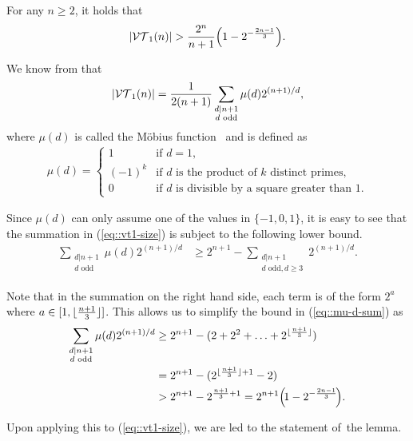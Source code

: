 \begin{lemma} \label{prop::vt1-lower-bound}
    For any $n \geq 2$, it holds that
    \begin{equation*}
        |\vt{1}{n}| > \frac{2^n}{n+1} \parenv*{1-2^{-\frac{2n-1}{3}}}.
    \end{equation*}
\end{lemma}
\begin{IEEEproof}
    We know from \cite[Corollary 2.3]{sloaneSingleDeletionCorrectingCodes2002} that
    \begin{align}
        |\mathcal{VT}_{1}(n)| = \frac{1}{2(n+1)} \sum_{\substack{d|n+1 \\ d \text{ odd}}} \mu(d)2^{(n+1)/d}, \label{eq::vt1-size}
    \end{align}
    where $\mu(d)$ is called the Möbius function~\cite{mobius1832} and is defined as
    \begin{align*}
        \mu(d) = \begin{cases}
            1 \!\! & \!\! \text{if } d=1, \\
            (-1)^k \!\! & \!\! \text{if $d$ is the product of $k$ distinct primes,} \\
            0 \!\! & \!\! \text{if $d$ is divisible by a square greater than $1$.}            
        \end{cases}
    \end{align*}

    Since $\mu(d)$ can only assume one of the values in $\{-1,0,1\}$, it is easy to see that the summation in (\ref{eq::vt1-size}) is subject to the following lower bound.
    \begin{align}
        \sum_{\substack{d|n+1 \\ d \text{ odd}}} \mu(d)2^{(n+1)/d} &\geq  2^{n+1} - \sum_{\substack{d|n+1 \\ d \text{ odd}, d \geq 3}} 2^{(n+1)/d}. \label{eq::mu-d-sum}
    \end{align}

    Note that in the summation on the right hand side, each term is of the form $2^a$ where $a \in [1, \lfloor \frac{n+1}{3} \rfloor]$. This allows us to simplify the bound in (\ref{eq::mu-d-sum}) as
    \begin{align*}
        \sum_{\substack{d|n+1 \\ d \text{ odd}}} \mu(d)2^{(n+1)/d} &\geq  2^{n+1} - (2 + 2^2 + \ldots + 2^{\floor{\frac{n+1}{3}}}) \\
        &= 2^{n+1} - (2^{\floor{\frac{n+1}{3}}+1} - 2) \\
        &> 2^{n+1} - 2^{\frac{n+1}{3}+1} = 2^{n+1} \parenv*{\!1-2^{-\frac{2n-1}{3}}\!}.
    \end{align*}

    Upon applying this to (\ref{eq::vt1-size}), we are led to the statement of~the lemma.    
\end{IEEEproof}

